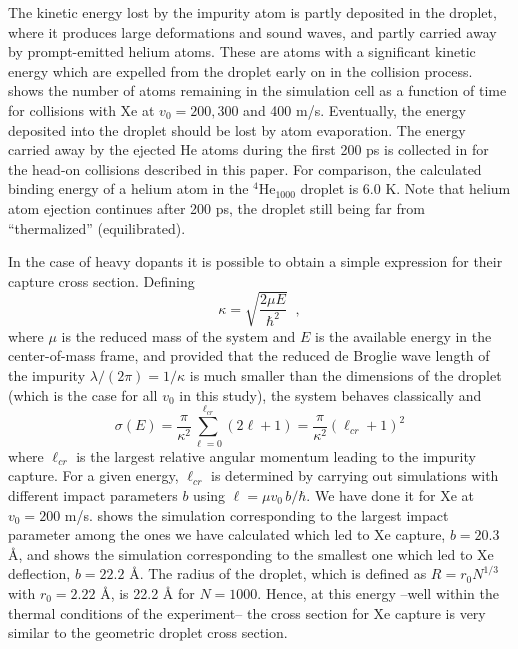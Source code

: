 The kinetic energy lost by the impurity atom is partly deposited 
in the droplet, where it produces large deformations and sound waves, 
and partly carried away by   prompt-emitted helium atoms. These are atoms  with a 
significant kinetic energy which are expelled from the droplet  
early on in the collision process. 
   shows the number of atoms remaining in the simulation cell as a function of time
for collisions with Xe at $v_0= 200, 300 $ and 400 m/s. 
Eventually, the energy deposited into the droplet should be lost by atom evaporation.
The energy carried away by the ejected He atoms during the first 200 ps is 
collected in  for the head-on collisions described in this paper.
For comparison, the  calculated binding energy of  a helium atom in the $^4$He$_{1000}$ droplet is $6.0$ K.
Note that helium atom ejection continues after 200 ps, the droplet still being far from ``thermalized'' (equilibrated).

In the case of heavy dopants it is possible to obtain 
a simple expression for their capture cross 
section.  Defining
%
\begin{equation}
\kappa=\sqrt{\frac{2 \mu E}{\hbar^2}} \;\; ,
\label{eq9}
\end{equation}
%
where $\mu$ is the reduced mass of the system and
$E$ is the available energy in the center-of-mass frame, and 
provided that the reduced de Broglie wave length of the impurity
$\lambda/(2 \pi) = 1/\kappa$ is much smaller than the dimensions 
of the droplet (which is the case for all $v_0$  in this study), the system
behaves classically and\citep{Lea14a}
%
\begin{equation}
\sigma(E)= \frac{\pi}{\kappa^2 } \sum_{\ell=0}^{\ell_{cr}} (2 \ell
+1)= \frac{\pi}{\kappa^2 } (\ell_{cr} +1)^2  
\label{eq10}
\end{equation}
%
where $\ell_{cr}$ is the largest relative angular momentum leading to the impurity capture. 
For a given energy, $\ell_{cr}$ is determined by 
carrying out simulations with different impact parameters $b$ using  
$\ell= \mu v_0 \, b/\hbar$.
We have done it for Xe at $v_0= 200$ m/s.  shows the 
simulation corresponding to the largest impact parameter among the ones we have calculated
which led to Xe capture, $b=20.3$ \AA{}, and
 shows the simulation corresponding to the smallest one
which led to Xe deflection, $b=22.2$ \AA{}.
The radius of the 
droplet, which is defined as $R= r_0 N^{1/3}$ 
with $r_0 = 2.22$ \AA{}, is 22.2 \AA{} for $N=1000$. 
Hence, at this energy --well within the thermal conditions of the experiment--
the cross section for Xe capture is very similar to the geometric droplet cross section. 

